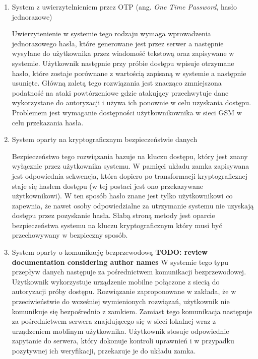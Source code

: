 \begin{enumerate}[label=\Alph*.]
			\item System z uwierzytelnieniem przez OTP (ang. \textit{One Time Password}, hasło jednorazowe)

				Uwierzytenienie w systemie tego rodzaju wymaga wprowadzenia jednorazowego hasła, które generowane jest przez serwer a następnie wysyłane do użytkownika przez wiadomość tekstową oraz zapisywane w systemie. Użytkownik następnie przy próbie dostępu wpisuje otrzymane hasło, które zostaje porównane z wartością zapisaną w systemie a następnie usunięte. Główną zaletą tego rozwiązania jest znacząco zmniejszona podatność na ataki powtórzeniowe gdzie atakujący przechwytuje dane wykorzystane do autoryzacji i używa ich ponownie w celu uzyskania dostępu. Problemem jest wymaganie dostępności użytkownikownika w sieci GSM w celu przekazania hasła.

			\item System oparty na kryptograficznym bezpieczeństwie danych

				Bezpieczeństwo tego rozwiązania bazuje na kluczu dostępu, który jest znany wyłącznie przez użytkownika systemu. W pamięci układu zamka zapisywana jest odpowiednia sekwencja, która dopiero po transformacji kryptograficznej staje się hasłem dostępu (w tej postaci jest ono przekazywane użytkownikowi). W ten sposób hasło znane jest tylko użytkownikowi co zapewnia, że nawet osoby odpowiedzialne za utrzymanie systemu nie uzyskają dostępu przez pozyskanie hasła. Słabą stroną metody jest oparcie bezpieczeństwa systemu na kluczu kryptograficznym który musi być przechowywany w bezpieczny sposób.

			\item System oparty o komunikację bezprzewodową
				\textbf{TODO: review documentation considering author names}
				W systemie tego typu przepływ danych następuje za pośrednictwem komunikacji bezprzewodowej. Użytkownik wykorzystuje urządzenie mobilne połączone z siecią do autoryzacji próby dostępu. Rozwiązanie zaproponowane w \cite{cryptographic-iot-access-system} zakłada, że w przeciwieństwie do wcześniej wymienionych rozwiązań, użytkownik nie komunikuje się bezpośrednio z zamkiem. Zamiast tego komunikacja następuje za pośrednictwem serwera znajdującego się w sieci lokalnej wraz z urządzeniem moblinym użytkownika. Użytkownik stosuje odpowiednie zapytanie do serwera, który dokonuje kontroli uprawnień i w przypadku pozytywnej ich weryfikacji, przekazuje je do układu zamka.

		\end{enumerate}

